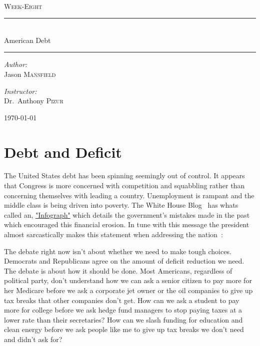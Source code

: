 \documentclass[pdflatex,12pt,a4paper]{report}
\newcommand{\HRule}{\rule{\linewidth}{0.5mm}}
\begin{document}
%
\begin{titlepage}
\begin{center}
\textsc{\color{Sepia}{\LARGE EC~320}}\\[1.5cm]

\textsc{\Large Week-Eight}
\HRule\\[0.5cm]
{ \huge American Debt}\\[0.4cm]
\HRule 


\begin{minipage}{0.4\textwidth}
\begin{flushleft} \large
\emph{Author:}\\
Jason \textsc{Mansfield}
\end{flushleft}
\end{minipage}
\begin{minipage}{0.4\textwidth}
\begin{flushright} \large
\emph{Instructor:} \\
Dr.~Anthony \textsc{Pizur}
\end{flushright}
\end{minipage}
\vfill

{\large \today}

\end{center}
\end{titlepage}

\section{Debt and Deficit}
\begin{doublespace}
The United States debt has been spinning seemingly out of control. It appears that Congress is more concerned with competition and squabbling rather than concerning themselves with leading a country. Unemployment is rampant and the middle class is being driven into poverty. The White House Blog~\citep{phillips_infographic:_2011} has whats called an, \href{http://www.whitehouse.gov/infographics/us-national-debt}{"Infograph"} which details the government's mistakes made in the past which encouraged this financial erosion. In tune with this message the president almost sarcastically makes this statement when addressing the nation~\cite{curtis_colleen_president_2011}: 
\end{doublespace} 
\begin{citation}

The debate right now isn’t about whether we need to make tough choices.  Democrats and Republicans agree on the amount of deficit reduction we need. The debate is about how it should be done.  Most Americans, regardless of political party, don’t understand how we can ask a senior citizen to pay more for her Medicare before we ask a corporate jet owner or the oil companies to give up tax breaks that other companies don’t get.  How can we ask a student to pay more for college before we ask hedge fund managers to stop paying taxes at a lower rate than their secretaries?  How can we slash funding for education and clean energy before we ask people like me to give up tax breaks we don’t need and didn’t ask for?  
\end{citation}
\end{document}
